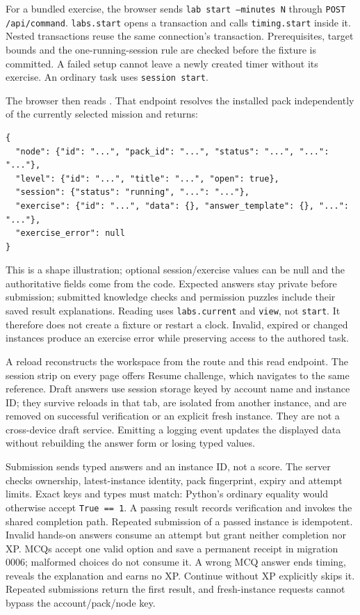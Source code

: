 For a bundled exercise, the browser sends \texttt{lab start --minutes N} through
\texttt{POST /api/command}. \texttt{labs.start} opens a transaction and calls
\texttt{timing.start} inside it. Nested transactions reuse the same connection's
transaction. Prerequisites, target bounds and the one-running-session rule are
checked before the fixture is committed. A failed setup cannot leave a newly
created timer without its exercise. An ordinary task uses \texttt{session start}.

The browser then reads . That endpoint resolves
the installed pack independently of the currently selected mission and returns:
\begin{verbatim}
{
  "node": {"id": "...", "pack_id": "...", "status": "...", "...": "..."},
  "level": {"id": "...", "title": "...", "open": true},
  "session": {"status": "running", "...": "..."},
  "exercise": {"id": "...", "data": {}, "answer_template": {}, "...": "..."},
  "exercise_error": null
}
\end{verbatim}
This is a shape illustration; optional session/exercise values can be null and
the authoritative fields come from the code. Expected answers stay private before
submission; submitted knowledge checks and permission puzzles include their saved
result explanations.
Reading uses \texttt{labs.current} and \texttt{view}, not \texttt{start}. It therefore
does not create a fixture or restart a clock. Invalid, expired or changed instances
produce an exercise error while preserving access to the authored task.

A reload reconstructs the workspace from the route and this read endpoint. The
session strip on every page offers Resume challenge, which navigates to the same
reference. Draft answers use session storage keyed by account name and instance ID;
they survive reloads in that tab, are isolated from another instance, and are removed
on successful verification or an explicit fresh instance. They are not a cross-device
draft service. Emitting a logging event updates the displayed data without rebuilding
the answer form or losing typed values.

Submission sends typed answers and an instance ID, not a score. The server checks
ownership, latest-instance identity, pack fingerprint, expiry and attempt limits.
Exact keys and types must match: Python's ordinary equality would otherwise accept
\texttt{True == 1}. A passing result records verification and invokes the shared
completion path. Repeated submission of a passed instance is idempotent. Invalid
hands-on answers consume an attempt but grant neither completion nor XP. MCQs accept
one valid option and save a permanent receipt in migration 0006; malformed choices
do not consume it. A wrong MCQ answer ends timing, reveals the explanation and earns
no XP. Continue without XP explicitly skips it. Repeated submissions return the
first result, and fresh-instance requests cannot bypass the account/pack/node key.

